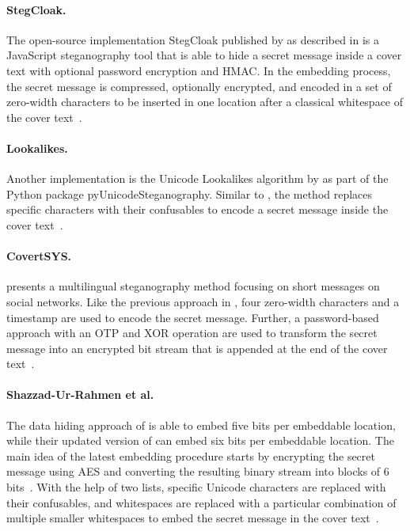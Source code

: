 	\paragraph{StegCloak.} The open-source implementation StegCloak published by \citet{KuroLabs.2020} as described in \citet{Mohanasundar.2020} is a JavaScript steganography tool that is able to hide a secret message inside a cover text with optional password encryption and \ac{HMAC}. In the embedding process, the secret message is compressed, optionally encrypted, and encoded in a set of zero-width characters to be inserted in one location after a classical whitespace of the cover text~\citep{Mohanasundar.2020}.
	
	\paragraph{Lookalikes.} Another implementation is the Unicode Lookalikes algorithm by \citet{Thompson.2021} as part of the Python package pyUnicodeSteganography. Similar to \citet{Rizzo.2019}, the method replaces specific characters with their confusables to encode a secret message inside the cover text~\citep{Thompson.2021}.
	
	\paragraph{CovertSYS.} \citet{Ahvanooey.2022b} presents a multilingual steganography method focusing on short messages on social networks. Like the previous approach in \citet{Ahvanooey.2018}, four zero-width characters and a timestamp are used to encode the secret message. Further, a password-based approach with an \ac{OTP} and XOR operation are used to transform the secret message into an encrypted bit stream that is appended at the end of the cover text~\citep{Ahvanooey.2022b}.
	
	\paragraph{Shazzad-Ur-Rahmen et al.} The data hiding approach of \citet{ShazzadUrRahman.2021} is able to embed five bits per embeddable location, while their updated version of \citet{ShazzadUrRahman.2023} can embed six bits per embeddable location. The main idea of the latest embedding procedure starts by encrypting the secret message using AES and converting the resulting binary stream into blocks of 6 bits~\citep{ShazzadUrRahman.2023}. With the help of two lists, specific Unicode characters are replaced with their confusables, and whitespaces are replaced with a particular combination of multiple smaller whitespaces to embed the secret message in the cover text~\citep{ShazzadUrRahman.2023}.
	
